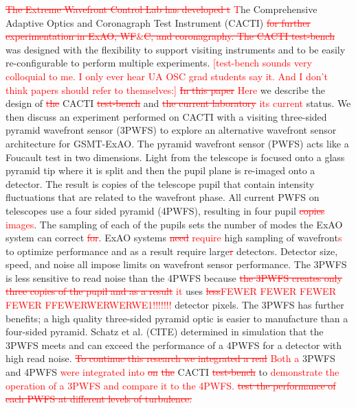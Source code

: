 \documentclass[12pt]{spieman}  %
\newcommand{\jrmadd}[1]{\textcolor{red}{#1}}
\newcommand{\jrmrmv}[1]{\textcolor{red}{\sout{#1}}}
\newcommand{\jrmcom}[1]{\textcolor{red}{[#1]}}
\begin{document}
\begin{spacing}{2}
\jrmrmv{The Extreme Wavefront Control Lab has developed t} \jrmadd{T}he Comprehensive Adaptive Optics and Coronagraph Test Instrument (CACTI) \jrmrmv{for further experimentation in ExAO, WF$\&$C, and coronagraphy. The CACTI test-bench} was designed with the flexibility to support visiting instruments and to be easily re-configurable to perform multiple experiments. \jrmcom{test-bench sounds very colloquial to me.  I only ever hear UA OSC grad students say it.  And I don't think papers should refer to themselves:} \jrmrmv{In this paper} \jrmadd{Here} we describe the design of \jrmrmv{the} CACTI \jrmrmv{test-bench} and \jrmrmv{the current laboratory} \jrmadd{its current} status. We then discuss an experiment performed on CACTI with a visiting three-sided pyramid wavefront sensor (3PWFS) to explore an alternative wavefront sensor architecture for GSMT-ExAO. The pyramid wavefront sensor (PWFS) acts like a Foucault test in two dimensions. Light from the telescope is focused onto a glass pyramid tip where it is split and then the pupil plane is re-imaged onto a detector. The result is copies of the telescope pupil that contain intensity fluctuations that are related to the wavefront phase. All current PWFS on telescopes use a four sided pyramid (4PWFS), resulting in four pupil \jrmrmv{copies} \jrmadd{images}. The sampling of each of the pupils sets the number of modes the ExAO system can correct \jrmrmv{for}. ExAO systems \jrmrmv{need} \jrmadd{require} high sampling of wavefront\jrmadd{s} to optimize performance and as a result require large\jrmrmv{r} detectors. Detector size, speed, and noise all impose limits on wavefront sensor performance. The 3PWFS is less sensitive to read noise than the 4PWFS because \jrmrmv{the 3PWFS creates only three copies of the pupil and as a result} \jrmadd{it} uses \jrmrmv{less}\jrmadd{FEWER FEWER FEWER FEWER FFEWERWERWERWE1!!!!!!!} detector pixels. The 3PWFS has further benefits; a high quality three-sided pyramid optic is easier to manufacture than a four-sided pyramid. Schatz et al. (CITE) determined in simulation that the 3PWFS meets and can exceed the performance of a 4PWFS for a detector with high read noise. \jrmrmv{To continue this research we integrated a real} \jrmadd{Both a} 3PWFS and 4PWFS \jrmadd{were integrated into} \jrmrmv{on} \jrmrmv{the} CACTI \jrmrmv{test-bench} to \jrmadd{demonstrate the operation of a 3PWFS and compare it to the 4PWFS.} \jrmrmv{test the performance of each PWFS at different levels of turbulence.}


\end{spacing}
\end{document}
